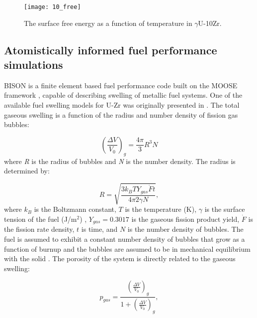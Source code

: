 \documentclass[review]{elsarticle}
\begin{document}
\begin{figure}[!htp]
\begin{center}
\texttt{[image: 10\_free]}
\end{center}
\caption{The surface free energy as a function of temperature in $\gamma$U-10Zr.}
\label{fig:free}
\end{figure}

\FloatBarrier

\subsection{Atomistically informed fuel performance simulations}

BISON is a finite element based fuel performance code built on the MOOSE framework \cite{tonks2017}, capable of describing swelling of metallic fuel systems. One of the available fuel swelling models for U-Zr was originally presented in \cite{olander76}. The total gaseous swelling is a function of the radius and number density of fission gas bubbles:

\begin{equation}
  \left(\frac{\Delta V}{V_0}\right)_{g}=\frac{4\pi}{3}R^3 N
  \label{eq:swelling}
\end{equation} where \textit{R} is the radius of bubbles and \textit{N} is the number density. The radius is determined by:

\begin{equation}
  \label{bubble_radius}
  R = \sqrt{\frac{3 k_B T Y_{gas} \dot{F} t}{4 \pi 2 \gamma N}},
\end{equation} where $k_B$ is the Boltzmann constant, $T$ is the temperature (K), $\gamma$ is the surface tension of the fuel (J/m$^2$) \cite{karahan2009}, $Y_{gas}=0.3017$ is the gaseous fission product yield, $\dot{F}$ is the fission rate density, $t$ is time, and $N$ is the number density of bubbles. The fuel is assumed to exhibit a constant number density of bubbles that grow as a function of burnup and the bubbles are assumed to be in mechanical equilibrium with the solid \cite{olander76}. The porosity of the system is directly related to the gaseous swelling: 

\begin{equation}
  p_{gas} = \frac{\left(\frac{\Delta V}{V_0}\right)_{g}}{1 + \left(\frac{\Delta V}{V_0}\right)_{g}},
\end{equation}
\end{document}
